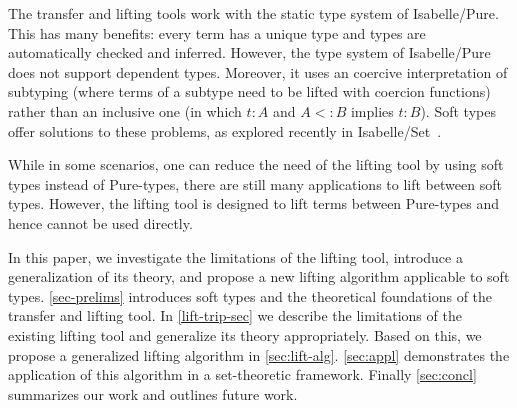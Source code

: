 \documentclass{article}
\theoremstyle{definition}
\newcommand{\nat}{\mathbb{N}}
\newcommand{\inte}{\mathbb{Z}}
\newcommand{\rat}{\mathbb{Q}}
\begin{document}
The transfer and lifting tools
work with the static type system of Isabelle/Pure.
This has many benefits:
every term has a unique type and types are automatically checked and inferred.
However, the type system of Isabelle/Pure
does not support dependent types.
Moreover, it uses an coercive interpretation of
subtyping (where terms of a subtype need to be lifted with coercion functions)
rather than an inclusive one (in which $t : A$ and $A <: B$ implies $t : B$).
Soft types offer solutions to these problems,
as explored recently in Isabelle/Set~\cite{isabelleset}.

While in some scenarios,
one can reduce the need of the lifting tool by using soft types instead of Pure-types,
there are still many applications to lift between soft types.
However, the lifting tool is designed to lift terms between Pure-types
and hence cannot be used directly.

In this paper,
we investigate the limitations of the lifting tool,
introduce a generalization of its theory,
and propose a new lifting algorithm applicable to soft types.
\cref{sec-prelims} introduces soft types and the theoretical foundations of the transfer and lifting tool.
In \cref{lift-trip-sec} we describe the limitations of the existing lifting tool
and generalize its theory appropriately.
Based on this, we propose a generalized lifting algorithm in \cref{sec:lift-alg}.
\cref{sec:appl} demonstrates the application of this algorithm in a set-theoretic framework.
Finally \cref{sec:concl} summarizes our work and outlines future work.
\end{document}
